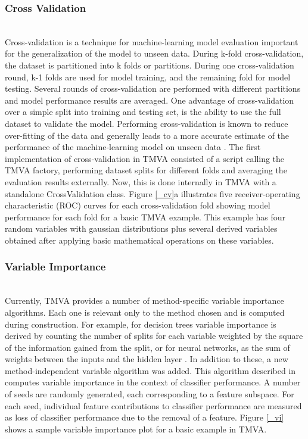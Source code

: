 \documentclass[a4paper]{jpconf}
\begin{document}
\subsubsection{Cross Validation}\hspace*{\fill} \\ 
Cross-validation is a technique for machine-learning model evaluation important for the generalization of the model to unseen data. During k-fold cross-validation, the dataset is partitioned into k folds or partitions. During one cross-validation round, k-1 folds are used for model training, and the remaining fold for model testing. Several rounds of cross-validation are performed with different partitions and model performance results are averaged. One advantage of cross-validation over a simple split into training and testing set, is the ability to use the full dataset to validate the model. Performing cross-validation is known to reduce over-fitting of the data and generally leads to a more accurate estimate of the performance of the machine-learning model on unseen data \cite{arlot2010survey}.\newline 
The first implementation of cross-validation in TMVA consisted of a script calling the TMVA factory, performing dataset splits for different folds and averaging the evaluation results externally. Now, this is done internally in TMVA with a standalone CrossValidation class. Figure \ref{_cv}a illustrates five receiver-operating characteristic (ROC) curves for each cross-validation fold showing model performance for each fold for a basic TMVA example. This example has four random variables with gaussian distributions plus several derived variables obtained after applying basic mathematical operations on these variables.

\subsubsection{Variable Importance}\hspace*{\fill} \\
Currently, TMVA provides a number of method-specific variable importance algorithms. Each one is relevant only to the method chosen and is computed during construction. For example, for decision trees variable importance is derived by counting the number of splits for each variable weighted by the square of the information gained from the split,   or for neural networks, as the sum of weights between the inputs and the hidden layer \cite{Hocker:2007ht}.\newline
In addition to these, a new method-independent variable algorithm was added. This algorithm described in\cite{gleyzer2008paradigm} computes variable importance in the context of classifier performance. A number of seeds are randomly generated, each corresponding to a feature subspace. For each seed, individual feature contributions to classifier performance are measured as loss of classifier performance due to the removal of a feature. Figure \ref{_vi} shows a sample variable importance plot for a basic example in TMVA.
\end{document}

